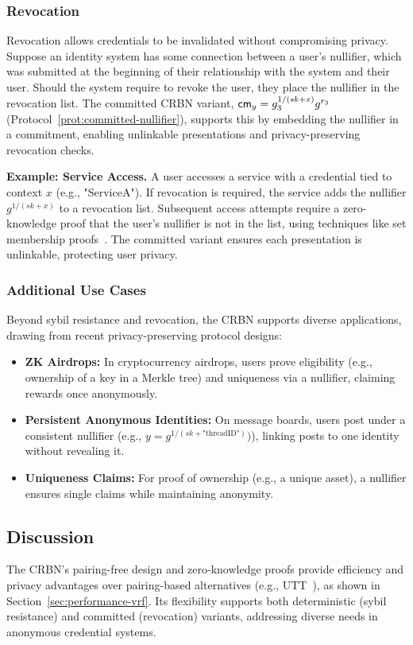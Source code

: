 \subsubsection{Revocation}\label{subsubsec:revocation}
Revocation allows credentials to be invalidated without compromising privacy. Suppose an identity system has some connection between a user's nullifier, which was submitted at the beginning of their relationship with the system and their user. Should the system require to revoke the user, they place the nullifier in the revocation list. The committed CRBN variant, $\mathsf{cm}_y = g_3^{1/(sk + x)} g^{r_3}$ (Protocol~\ref{prot:committed-nullifier}), supports this by embedding the nullifier in a commitment, enabling unlinkable presentations and privacy-preserving revocation checks.

\textbf{Example: Service Access.} A user accesses a service with a credential tied to context $x$ (e.g., "ServiceA"). If revocation is required, the service adds the nullifier $g^{1/(sk + x)}$ to a revocation list. Subsequent access attempts require a zero-knowledge proof that the user’s nullifier is not in the list, using techniques like set membership proofs~\cite{goos_dynamic_2002}. The committed variant ensures each presentation is unlinkable, protecting user privacy.

\subsubsection{Additional Use Cases}\label{subsubsec:other-applications}
Beyond sybil resistance and revocation, the CRBN supports diverse applications, drawing from recent privacy-preserving protocol designs:

\begin{itemize}
    \item \textbf{ZK Airdrops:} In cryptocurrency airdrops, users prove eligibility (e.g., ownership of a key in a Merkle tree) and uniqueness via a nullifier, claiming rewards once anonymously.
    \item \textbf{Persistent Anonymous Identities:} On message boards, users post under a consistent nullifier (e.g., $y = g^{1/(sk + \text{"threadID"})})$), linking posts to one identity without revealing it.
    \item \textbf{Uniqueness Claims:} For proof of ownership (e.g., a unique asset), a nullifier ensures single claims while maintaining anonymity.
\end{itemize}

\subsection{Discussion}
The CRBN’s pairing-free design and zero-knowledge proofs provide efficiency and privacy advantages over pairing-based alternatives (e.g., UTT~\cite{tomescu_utt_2022}), as shown in Section~\ref{sec:performance-vrf}. Its flexibility supports both deterministic (sybil resistance) and committed (revocation) variants, addressing diverse needs in anonymous credential systems.

